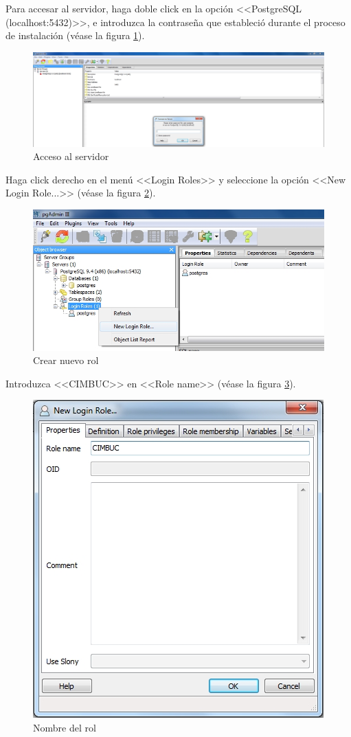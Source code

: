 Para accesar al servidor, haga doble click en la opci\'{o}n <<PostgreSQL (localhost:5432)>>, e introduzca la contrase\~{n}a que estableci\'{o} durante el proceso de instalaci\'{o}n (v\'{e}ase la figura \ref{fig:pgadmin-acceso}).

\begin{figure}[H]
  \centering
  \includegraphics[width=1\linewidth]{./img/pgadmin-acceso.jpg}
\caption[Acceso al servidor]{Acceso al servidor\label{fig:pgadmin-acceso}}
\end{figure}

\newpage

Haga click derecho en el men\'{u} <<Login Roles>> y seleccione la opci\'{o}n <<New Login Role...>> (v\'{e}ase la figura \ref{fig:pgadmin-rol}).

\begin{figure}[H]
  \centering
  \includegraphics[width=1\linewidth]{./img/pgadmin-rol.jpg}
\caption[Crear nuevo rol]{Crear nuevo rol\label{fig:pgadmin-rol}}
\end{figure}

Introduzca <<CIMBUC>> en <<Role name>> (v\'{e}ase la figura \ref{fig:pgadmin-rol-nombre}).

\begin{figure}[H]
  \centering
  \includegraphics[width=.5\linewidth]{./img/pgadmin-rol-nombre.jpg}
\caption[Nombre del rol]{Nombre del rol\label{fig:pgadmin-rol-nombre}}
\end{figure}

